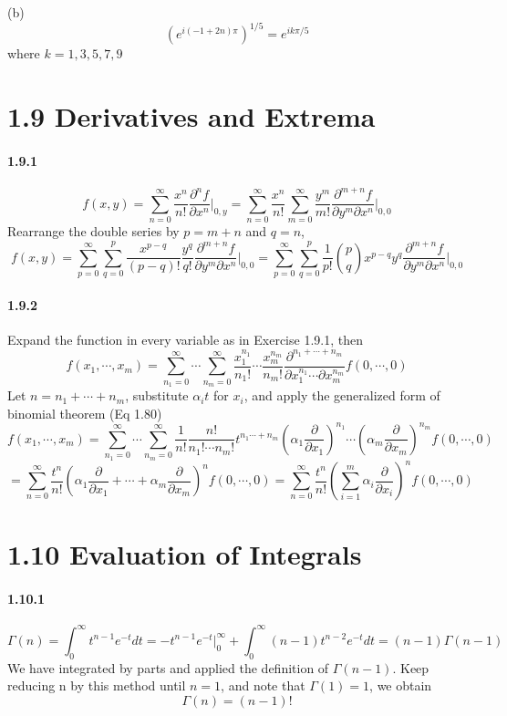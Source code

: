 \documentclass[a4paper]{article}
\begin{document}
(b) \[\left(e^{i(-1+2n)\pi} \right)^{1/5}=e^{ik\pi/5} \]
where $k=1,3,5,7,9$

\section*{1.9 Derivatives and Extrema}

\paragraph{1.9.1}
\[f(x,y)=\sum_{n=0}^\infty\frac{x^n}{n!}\frac{\partial^nf}{\partial x^n}\Big|_{0,y}=
\sum_{n=0}^\infty\frac{x^n}{n!}\sum_{m=0}^\infty\frac{y^m}{m!}\frac{\partial^{m+n}f}{\partial y^m\partial x^n}\Big|_{0,0}\]
Rearrange the double series by $p=m+n$ and $q=n$,
\[f(x,y)=\sum_{p=0}^\infty\sum_{q=0}^p\frac{x^{p-q}}{(p-q)!}\frac{y^q}{q!}\frac{\partial^{m+n}f}{\partial y^m\partial x^n}\Big|_{0,0}
=\sum_{p=0}^\infty\sum_{q=0}^p\frac{1}{p!}\binom{p}{q}x^{p-q}y^q\frac{\partial^{m+n}f}{\partial y^m\partial x^n}\Big|_{0,0}\]

\paragraph{1.9.2}
Expand the function in every variable as in Exercise 1.9.1, then
\[f(x_1,\cdots,x_m)=\sum_{n_1=0}^\infty\cdots\sum_{n_m=0}^\infty\frac{x_1^{n_1}}{n_1!}\cdots\frac{x_m^{n_m}}{n_m!}\frac{\partial^{n_1+\cdots+n_m}}{\partial x_1^{n_1}\cdots\partial x_m^{n_m}}f(0,\cdots,0)\]
Let $n=n_1+\cdots+n_m$, substitute $\alpha_i t$ for $x_i$, and apply the generalized form of binomial theorem (Eq 1.80)
\[f(x_1,\cdots,x_m)=\sum_{n_1=0}^\infty\cdots\sum_{n_m=0}^\infty\frac{1}{n!}\frac{n!}{n_1!\cdots n_m!}t^{n_1\cdots+n_m}\left(\alpha_1\frac{\partial}{\partial x_1} \right)^{n_1}\cdots\left(\alpha_m\frac{\partial}{\partial x_m} \right)^{n_m}f(0,\cdots,0)\]
\[=\sum_{n=0}^\infty\frac{t^n}{n!}\left(\alpha_1\frac{\partial}{\partial x_1}+\cdots+\alpha_m\frac{\partial}{\partial x_m} \right)^nf(0,\cdots,0)
=\sum_{n=0}^\infty\frac{t^n}{n!}\left(\sum_{i=1}^m\alpha_i\frac{\partial}{\partial x_i} \right)^n f(0,\cdots,0)\]

\section*{1.10 Evaluation of Integrals}

\paragraph{1.10.1}
\[\Gamma(n)=\int_0^\infty t^{n-1}e^{-t}dt=-t^{n-1}e^{-t}\Big|_0^\infty+\int_0^\infty(n-1)t^{n-2}e^{-t}dt=(n-1)\Gamma(n-1)\]
We have integrated by parts and applied the definition of $\Gamma(n-1)$. Keep reducing n by this method until $n=1$, and note that $\Gamma(1)=1$, we  obtain
\[\Gamma(n)=(n-1)!\]
\end{document}
